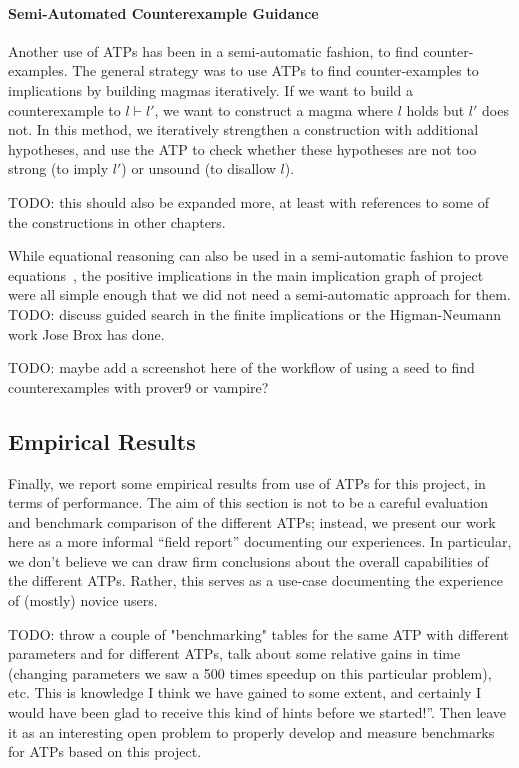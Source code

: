 \paragraph{Semi-Automated Counterexample Guidance}

Another use of ATPs has been in a semi-automatic fashion, to find counter-examples.
The general strategy was to use ATPs to find counter-examples to implications by building magmas iteratively.
If we want to build a counterexample to $l \vdash l'$, we want to construct a magma where $l$ holds but $l'$ does not.
In this method, we iteratively strengthen a construction with additional hypotheses, and use the ATP to check whether these hypotheses are not too strong (to imply $l'$) or unsound (to disallow $l$).

TODO: this should also be expanded more, at least with references to some of the constructions in other chapters.

While equational reasoning can also be used in a semi-automatic fashion to prove equations~\cite{DBLP:journals/pacmpl/KoehlerGBGTS24}, the positive implications in the main implication graph of project were all simple enough that we did not need a semi-automatic approach for them.
TODO: discuss guided search in the finite implications or the Higman-Neumann work Jose Brox has done.

TODO: maybe add a screenshot here of the workflow of using a seed to find counterexamples with prover9 or vampire?

\subsection{Empirical Results}

Finally, we report some empirical results from use of ATPs for this project, in terms of performance.
The aim of this section is not to be a careful evaluation and benchmark comparison of the different ATPs; instead, we present our work here as a more informal ``field report'' documenting our experiences.
In particular, we don't believe we can draw firm conclusions about the overall capabilities of the different ATPs.
Rather, this serves as a use-case documenting the experience of (mostly) novice users.

TODO: throw a couple of "benchmarking" tables for the same ATP with different parameters and for different ATPs, talk about some relative gains in time (changing parameters we saw a 500 times speedup on this particular problem), etc. This is knowledge I think we have gained to some extent, and certainly I would have been glad to receive this kind of hints before we started!''.  Then leave it as an interesting open problem to properly develop and measure benchmarks for ATPs based on this project.

